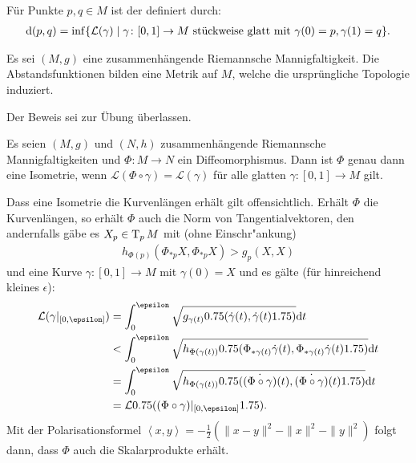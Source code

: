 \begin{Dfn}
  Für Punkte $p, q \in M$ ist der  definiert durch:
  \begin{align*}
    \mathrm{d}(p,q) = \inf\{ \mathcal L(\gamma) \mid \gamma \colon [0,1] \to M \text{ stückweise glatt mit } \gamma(0) = p, \gamma(1) = q\}.
  \end{align*}
\end{Dfn}

\begin{Satz}
  Es sei $(M,g)$ eine zusammenhängende Riemannsche Mannigfaltigkeit.
  Die Abstandsfunktionen bilden eine Metrik auf $M$, welche die ursprüngliche Topologie induziert.
\end{Satz}

Der Beweis sei zur Übung überlassen.

\begin{Satz}
  Es seien $(M,g)$ und $(N,h)$ zusammenhängende Riemannsche Mannigfaltigkeiten und $\Phi \colon M \to N$ ein Diffeomorphismus.
  Dann ist $\Phi$ genau dann eine Isometrie, wenn $\mathcal L(\Phi \circ \gamma) = \mathcal L(\gamma)$ für alle glatten $\gamma \colon [0,1] \to M$ gilt. 
\end{Satz}

\begin{bew}
  Dass eine Isometrie die Kurvenlängen erhält gilt offensichtlich. Erhält $\Phi$ die Kurvenlängen, so erhält $\Phi$ auch die Norm von Tangentialvektoren, den andernfalls gäbe es $X_p \in \operatorname{T}_pM$ mit (ohne Einschr"ankung)
  \begin{align*}
    h_{\Phi(p)}(\Phi_{*p}X,\Phi_{*p}X) > g_p(X,X)
  \end{align*}
  und eine Kurve $\gamma\colon [0,1] \to M$ mit $\gamma(0) = X$ und es gälte (für hinreichend kleines $\epsilon$):
  \begin{align*}
    \mathcal L(\gamma|_{[0,\epsilon]}) & = \int_0^{\epsilon}\sqrt{g_{\gamma(t)}\left(\dot\gamma(t),\dot\gamma(t)\right)}\dop t\\
    & < \int_0^{\epsilon}\sqrt{h_{\Phi(\gamma(t))} \left(\Phi_{*\gamma(t)}\dot\gamma(t), \Phi_{*\gamma(t)}\dot\gamma(t)\right)}\dop t\\
    & = \int_0^{\epsilon}\sqrt{h_{\Phi(\gamma(t))} \left(\dot{(\Phi \circ \gamma)}(t), \dot{(\Phi \circ \gamma)}(t) \right)}\dop t\\
    & = \mathcal L \left((\Phi \circ \gamma)|_{[0,\epsilon]}\right).
  \end{align*}
  Mit der Polarisationsformel $\left<x,y\right> = - \frac{1}2 (\|x-y\|^{2} - \|x\|^2-\|y\|^2)$ folgt dann, dass $\Phi$ auch die Skalarprodukte erhält.
\end{bew}

